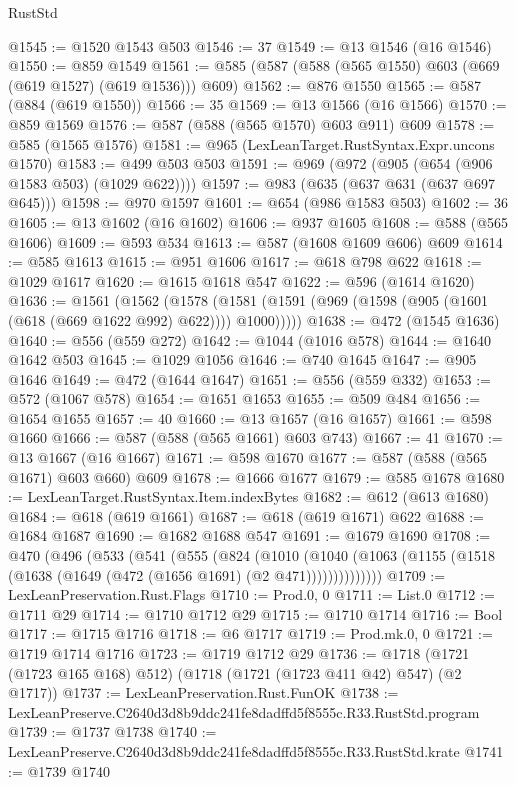 \begin{lexlean}{RustStd}
\begin{coremodule}
@1545 := @1520 @1543 @503
@1546 := 37
@1549 := @13 @1546 (@16 @1546)
@1550 := @859 @1549
@1561 := @585 (@587 (@588 (@565 @1550) @603 (@669 (@619 @1527) (@619 @1536))) @609)
@1562 := @876 @1550
@1565 := @587 (@884 (@619 @1550))
@1566 := 35
@1569 := @13 @1566 (@16 @1566)
@1570 := @859 @1569
@1576 := @587 (@588 (@565 @1570) @603 @911) @609
@1578 := @585 (@1565 @1576)
@1581 := @965 (LexLeanTarget.RustSyntax.Expr.uncons @1570)
@1583 := @499 @503 @503
@1591 := @969 (@972 (@905 (@654 (@906 @1583 @503) (@1029 @622))))
@1597 := @983 (@635 (@637 @631 (@637 @697 @645)))
@1598 := @970 @1597
@1601 := @654 (@986 @1583 @503)
@1602 := 36
@1605 := @13 @1602 (@16 @1602)
@1606 := @937 @1605
@1608 := @588 (@565 @1606)
@1609 := @593 @534
@1613 := @587 (@1608 @1609 @606) @609
@1614 := @585 @1613
@1615 := @951 @1606
@1617 := @618 @798 @622
@1618 := @1029 @1617
@1620 := @1615 @1618 @547
@1622 := @596 (@1614 @1620)
@1636 := @1561
    (@1562
      (@1578 (@1581 (@1591 (@969 (@1598 (@905 (@1601 (@618 (@669 @1622 @992) @622)))) @1000)))))
@1638 := @472 (@1545 @1636)
@1640 := @556 (@559 @272)
@1642 := @1044 (@1016 @578)
@1644 := @1640 @1642 @503
@1645 := @1029 @1056
@1646 := @740 @1645
@1647 := @905 @1646
@1649 := @472 (@1644 @1647)
@1651 := @556 (@559 @332)
@1653 := @572 (@1067 @578)
@1654 := @1651 @1653
@1655 := @509 @484
@1656 := @1654 @1655
@1657 := 40
@1660 := @13 @1657 (@16 @1657)
@1661 := @598 @1660
@1666 := @587 (@588 (@565 @1661) @603 @743)
@1667 := 41
@1670 := @13 @1667 (@16 @1667)
@1671 := @598 @1670
@1677 := @587 (@588 (@565 @1671) @603 @660) @609
@1678 := @1666 @1677
@1679 := @585 @1678
@1680 := LexLeanTarget.RustSyntax.Item.indexBytes
@1682 := @612 (@613 @1680)
@1684 := @618 (@619 @1661)
@1687 := @618 (@619 @1671) @622
@1688 := @1684 @1687
@1690 := @1682 @1688 @547
@1691 := @1679 @1690
@1708 := @470
    (@496
      (@533
        (@541
          (@555
            (@824
              (@1010
                (@1040 (@1063 (@1155 (@1518 (@1638 (@1649 (@472 (@1656 @1691) (@2 @471))))))))))))))
@1709 := LexLeanPreservation.Rust.Flags
@1710 := Prod.{0, 0}
@1711 := List.{0}
@1712 := @1711 @29
@1714 := @1710 @1712 @29
@1715 := @1710 @1714
@1716 := Bool
@1717 := @1715 @1716
@1718 := @6 @1717
@1719 := Prod.mk.{0, 0}
@1721 := @1719 @1714 @1716
@1723 := @1719 @1712 @29
@1736 := @1718 (@1721 (@1723 @165 @168) @512) (@1718 (@1721 (@1723 @411 @42) @547) (@2 @1717))
@1737 := LexLeanPreservation.Rust.FunOK
@1738 := LexLeanPreserve.C2640d3d8b9ddc241fe8dadffd5f8555c.R33.RustStd.program
@1739 := @1737 @1738
@1740 := LexLeanPreserve.C2640d3d8b9ddc241fe8dadffd5f8555c.R33.RustStd.krate
@1741 := @1739 @1740

\end{coremodule}
\end{lexlean}
